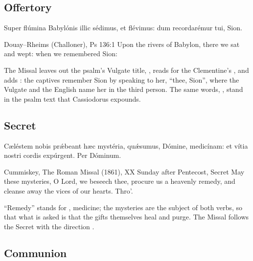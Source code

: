 \subsection{Offertory}
\label{proper-offertory}


\begin{latinproper}
Super flúmina Babylónis illic sédimus, et flévimus: dum recordarémur tui,
Sion.
\end{latinproper}

\begin{englishwitness}{Douay--Rheims (Challoner), Ps 136:1}
Upon the rivers of Babylon, there we sat and wept: when we remembered Sion:
\end{englishwitness}

\noindent The Missal leaves out the psalm's Vulgate title, , reads  for the Clementine's , and adds
: the captives remember Sion by speaking to her, ``thee, Sion'',
where the Vulgate and the English name her in the third person. The same words,
, stand in the psalm text that Cassiodorus
expounds.

\subsection{Secret}
\label{proper-secret}


\begin{latinproper}
Cæléstem nobis prǽbeant hæc mystéria, quǽsumus, Dómine, medicínam: et vítia
nostri cordis expúrgent. Per Dóminum.
\end{latinproper}

\begin{englishwitness}{Cummiskey, The Roman Missal (1861), XX Sunday after Pentecost, Secret}
May these mysteries, O Lord, we beseech thee, procure us a heavenly remedy, and
cleanse away the vices of our hearts. Thro'.
\end{englishwitness}

\noindent ``Remedy'' stands for , medicine; the mysteries are
the subject of both verbs, so that what is asked is that the gifts themselves
heal and purge. The Missal follows the Secret with the direction
.

\subsection{Communion}
\label{proper-communion}

